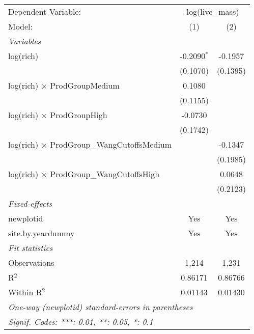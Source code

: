 \begin{tabular}{lcc}
\tabularnewline\midrule\midrule
Dependent Variable:&\multicolumn{2}{c}{log(live\_mass)}\\
Model:&(1) & (2)\\
\midrule \emph{Variables}&   &  \\
log(rich)&-0.2090$^{*}$ & -0.1957\\
  &(0.1070) & (0.1395)\\
log(rich) $\times $ ProdGroupMedium&0.1080 &   \\
  &(0.1155) &   \\
log(rich) $\times $ ProdGroupHigh&-0.0730 &   \\
  &(0.1742) &   \\
log(rich) $\times $ ProdGroup\_WangCutoffsMedium&   & -0.1347\\
  &   & (0.1985)\\
log(rich) $\times $ ProdGroup\_WangCutoffsHigh&   & 0.0648\\
  &   & (0.2123)\\
\midrule \emph{Fixed-effects}&   &  \\
newplotid & Yes & Yes\\
site.by.yeardummy & Yes & Yes\\
\midrule \emph{Fit statistics}&  & \\
Observations & 1,214&1,231\\
R$^2$ & 0.86171&0.86766\\
Within R$^2$ & 0.01143&0.01430\\
\midrule\midrule\multicolumn{3}{l}{\emph{One-way (newplotid) standard-errors in parentheses}}\\
\multicolumn{3}{l}{\emph{Signif. Codes: ***: 0.01, **: 0.05, *: 0.1}}\\
\end{tabular}


